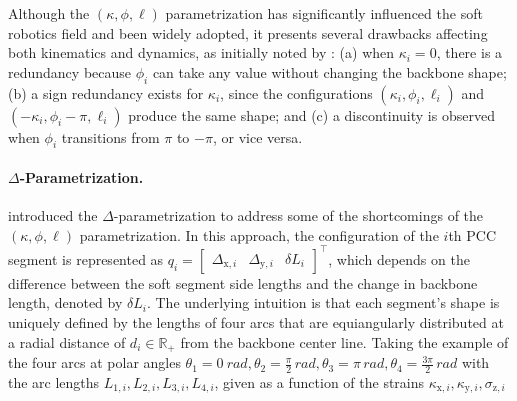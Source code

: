 Although the $(\kappa,\phi,\ell)$ parametrization has significantly influenced the soft robotics field and been widely adopted, it presents several drawbacks affecting both kinematics and dynamics, as initially noted by \citet{della2020improved}: (a) when $\kappa_i = 0$, there is a redundancy because $\phi_i$ can take any value without changing the backbone shape; (b) a sign redundancy exists for $\kappa_i$, since the configurations $(\kappa_i, \phi_i, \ell_i)$ and $(-\kappa_i, \phi_i-\pi, \ell_i)$ produce the same shape; and (c) a discontinuity is observed when $\phi_i$ transitions from $\pi$ to $-\pi$, or vice versa.

\paragraph{$\Delta$-Parametrization.}
\citet{della2020improved} introduced the $\Delta$-parametrization to address some of the shortcomings of the $(\kappa,\phi,\ell)$ parametrization. In this approach, the configuration of the $i$th \gls{PCC} segment is represented as 
$q_i = \begin{bmatrix}
    \Delta_{\mathrm{x},i} & \Delta_{\mathrm{y},i} & \delta L_i
\end{bmatrix}^\top$,
which depends on the difference between the soft segment side lengths and the change in backbone length, denoted by $\delta L_i$. The underlying intuition is that each segment’s shape is uniquely defined by the lengths of four arcs that are equiangularly distributed at a radial distance of $d_i \in \mathbb{R}_+$ from the backbone center line.
Taking the example of the four arcs at polar angles $\theta_1 = \SI{0}{rad}, \theta_2 = \frac{\pi}{2} \, \si{rad}, \theta_3 = \pi \, \si{rad}, \theta_4 = \frac{3\pi}{2} \, \si{rad}$ with the arc lengths $L_{1,i}, L_{2,i}, L_{3,i}, L_{4,i}$, given as a function of the strains $\kappa_{\mathrm{x},i}, \kappa_{\mathrm{y},i}, \sigma_{\mathrm{z},i}$ 
